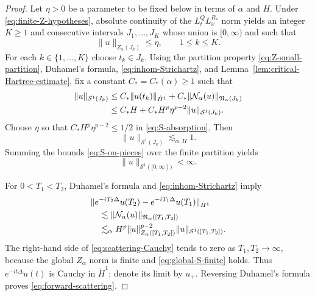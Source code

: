 \documentclass[preprint,12pt]{elsarticle}
\numberwithin{equation}{section}
\theoremstyle{remark}
\newcommand{\Ncal}{\mathcal N_{\alpha}}
\newcommand{\Znorm}{Z_{\alpha}}
\newcommand{\Nnorm}{\mathfrak N_{\alpha}}
\begin{document}
\begin{proof}
Let $\eta>0$ be a parameter to be fixed below in terms of $\alpha$ and $H$. Under \eqref{eq:finite-Z-hypotheses}, absolute continuity of the $L_t^Q L_x^{R_*}$ norm yields an integer $K\ge1$ and consecutive intervals $J_1,\dots,J_K$ whose union is $[0,\infty)$ and such that
\begin{equation}\label{eq:Z-small-partition}
  \|u\|_{\Znorm(J_k)}\le\eta,\qquad 1\le k\le K.
\end{equation}
For each $k\in\{1,\dots,K\}$ choose $t_k\in J_k$. Using the partition property \eqref{eq:Z-small-partition}, Duhamel's formula, \eqref{eq:inhom-Strichartz}, and Lemma~\ref{lem:critical-Hartree-estimate}, fix a constant $C_*=C_*(\alpha)\ge1$ such that
\begin{align}
  \|u\|_{\mathcal S^1(J_k)}
  &\le C_*\|u(t_k)\|_{\dot H^1}
  +C_*\|\Ncal(u)\|_{\Nnorm(J_k)}\notag\\
  &\le C_*H+C_*H^p\eta^{p-2}
  \|u\|_{\mathcal S^1(J_k)}.
  \label{eq:S-absorption}
\end{align}
Choose $\eta$ so that $C_*H^p\eta^{p-2}\le1/2$ in \eqref{eq:S-absorption}. Then
\begin{equation}\label{eq:S-on-pieces}
  \|u\|_{\mathcal S^1(J_k)}\lesssim_{\alpha,H}1.
\end{equation}
Summing the bounds \eqref{eq:S-on-pieces} over the finite partition yields
\begin{equation}\label{eq:global-S-finite}
  \|u\|_{\mathcal S^1([0,\infty))}<\infty.
\end{equation}

For $0<T_1<T_2$, Duhamel's formula and \eqref{eq:inhom-Strichartz} imply
\begin{align}
 &\|e^{-iT_2\Delta}u(T_2)-e^{-iT_1\Delta}u(T_1)\|_{\dot H^1}\notag\\
 &\quad\lesssim
 \|\Ncal(u)\|_{\Nnorm([T_1,T_2])}\notag\\
 &\quad\lesssim_\alpha
 H^p\|u\|_{\Znorm([T_1,T_2])}^{p-2}
 \|u\|_{\mathcal S^1([T_1,T_2])}.
 \label{eq:scattering-Cauchy}
\end{align}
The right-hand side of \eqref{eq:scattering-Cauchy} tends to zero as $T_1,T_2\to\infty$, because the global $\Znorm$ norm is finite and \eqref{eq:global-S-finite} holds. Thus $e^{-it\Delta}u(t)$ is Cauchy in $\dot H^1$; denote its limit by $u_+$. Reversing Duhamel's formula proves \eqref{eq:forward-scattering}.
\end{proof}
\end{document}
